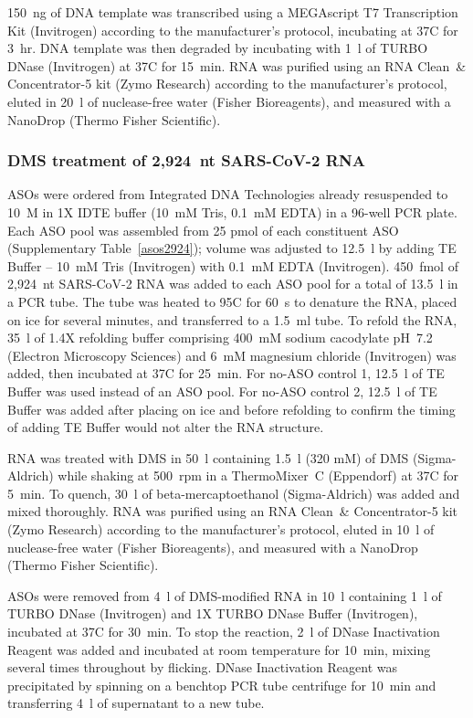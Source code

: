 \documentclass[main.tex]{subfiles}
\begin{document}
150~ng of DNA template was transcribed using a MEGAscript T7 Transcription Kit (Invitrogen) according to the manufacturer's protocol, incubating at 37\textdegree C for 3~hr.
DNA template was then degraded by incubating with 1~\textmu l of TURBO DNase (Invitrogen) at 37\textdegree C for 15~min.
RNA was purified using an RNA Clean~\& Concentrator-5 kit (Zymo Research) according to the manufacturer's protocol, eluted in 20~\textmu l of nuclease-free water (Fisher Bioreagents), and measured with a NanoDrop (Thermo Fisher Scientific).

\subsubsection{DMS treatment of 2,924~nt SARS-CoV-2 RNA}

ASOs were ordered from Integrated DNA Technologies already resuspended to 10~\textmu M in 1X IDTE buffer (10~mM Tris, 0.1~mM EDTA) in a 96-well PCR plate.
Each ASO pool was assembled from 25 pmol of each constituent ASO (Supplementary Table~\ref{asos2924}); volume was adjusted to 12.5~\textmu l by adding TE Buffer -- 10~mM Tris (Invitrogen) with 0.1~mM EDTA (Invitrogen).
450~fmol of 2,924~nt SARS-CoV-2 RNA was added to each ASO pool for a total of 13.5~\textmu l in a PCR tube.
The tube was heated to 95\textdegree C for 60~s to denature the RNA, placed on ice for several minutes, and transferred to a 1.5~ml tube.
To refold the RNA, 35~\textmu l of 1.4X refolding buffer comprising 400~mM sodium cacodylate pH~7.2 (Electron Microscopy Sciences) and 6~mM magnesium chloride (Invitrogen) was added, then incubated at 37\textdegree C for 25~min.
For no-ASO control 1, 12.5~\textmu l of TE Buffer was used instead of an ASO pool.
For no-ASO control 2, 12.5~\textmu l of TE Buffer was added after placing on ice and before refolding to confirm the timing of adding TE Buffer would not alter the RNA structure.

RNA was treated with DMS in 50~\textmu l containing 1.5~\textmu l (320 mM) of DMS (Sigma-Aldrich) while shaking at 500~rpm in a ThermoMixer~C (Eppendorf) at 37\textdegree C for 5~min.
To quench, 30~\textmu l of beta-mercaptoethanol (Sigma-Aldrich) was added and mixed thoroughly.
RNA was purified using an RNA Clean~\& Concentrator-5 kit (Zymo Research) according to the manufacturer's protocol, eluted in 10~\textmu l of nuclease-free water (Fisher Bioreagents), and measured with a NanoDrop (Thermo Fisher Scientific).

ASOs were removed from 4~\textmu l of DMS-modified RNA in 10~\textmu l containing 1~\textmu l of TURBO DNase (Invitrogen) and 1X TURBO DNase Buffer (Invitrogen), incubated at 37\textdegree C for 30~min.
To stop the reaction, 2~\textmu l of DNase Inactivation Reagent was added and incubated at room temperature for 10~min, mixing several times throughout by flicking.
DNase Inactivation Reagent was precipitated by spinning on a benchtop PCR tube centrifuge for 10~min and transferring 4~\textmu l of supernatant to a new tube.
\end{document}
